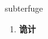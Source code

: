 
\begin{frame}
{\huge subterfuge}
\begin{center}
\begin{enumerate}\Large
  \item \textbf{诡计}
\end{enumerate}
\end{center}
\end{frame}
